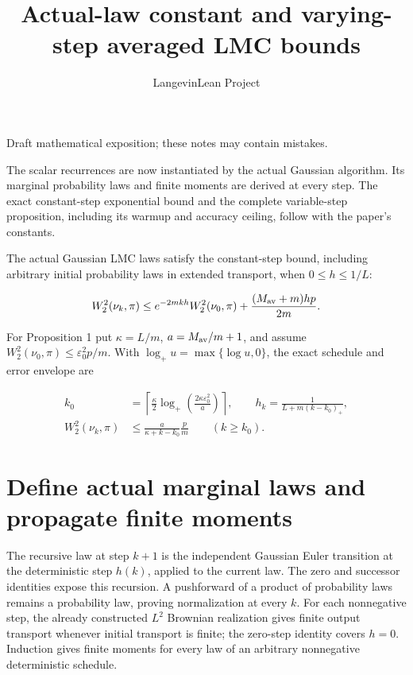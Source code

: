 \documentclass[11pt,a4paper]{article}
\title{\texorpdfstring{Actual-law constant and varying-step averaged LMC bounds}{Actual-law constant and varying-step averaged LMC bounds}}
\author{LangevinLean Project}
\date{}
\begin{document}
\maketitle
Draft mathematical exposition; these notes may contain mistakes.


The scalar recurrences are now instantiated by the actual Gaussian algorithm. Its marginal probability laws and finite moments are derived at every step. The exact constant-step exponential bound and the complete variable-step proposition, including its warmup and accuracy ceiling, follow with the paper’s constants.



The actual Gaussian LMC laws satisfy the constant-step bound, including arbitrary initial probability laws in extended transport, when \(0\le h\le1/L\):


\[W_2^2(\nu_k,\pi)\le e^{-2mkh}W_2^2(\nu_0,\pi)+\frac{(M_{\rm av}+m)hp}{2m}.\]


For Proposition 1 put \(\kappa=L/m\), \(a=M_{\rm av}/m+1\), and assume \(W_2^2(\nu_0,\pi)\le\varepsilon_0^2p/m\). With \(\log_+u=\max\{\log u,0\}\), the exact schedule and error envelope are


\[\begin{aligned}k_0&=\left\lceil\frac\kappa2\log_+\!\left(\frac{2\kappa\varepsilon_0^2}{a}\right)\right\rceil,\qquad h_k=\frac1{L+m(k-k_0)_+},\\ W_2^2(\nu_k,\pi)&\le\frac{a}{\kappa+k-k_0}\frac pm\qquad(k\ge k_0).\end{aligned}\]
\section{\texorpdfstring{Define actual marginal laws and propagate finite moments}{Define actual marginal laws and propagate finite moments}}


The recursive law at step \(k+1\) is the independent Gaussian Euler transition at the deterministic step \(h(k)\), applied to the current law. The zero and successor identities expose this recursion. A pushforward of a product of probability laws remains a probability law, proving normalization at every \(k\). For each nonnegative step, the already constructed \(L^{2}\) Brownian realization gives finite output transport whenever initial transport is finite; the zero-step identity covers \(h=0\). Induction gives finite moments for every law of an arbitrary nonnegative deterministic schedule.
\end{document}
